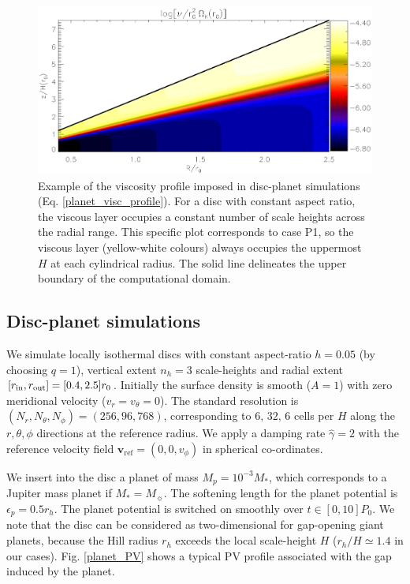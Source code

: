 \begin{figure}
  \centering
  \includegraphics[width=\linewidth]{figures/pdisk_visc2d_planet}
  \caption{Example of the viscosity profile
    imposed in disc-planet simulations
    (Eq. \ref{planet_visc_profile}).  
    For a disc with constant aspect ratio, the viscous
    layer occupies a constant number of scale heights across the
    radial range. This specific plot corresponds to case P1, so the
    viscous layer (yellow-white colours) always occupies the uppermost
    $H$ at each cylindrical radius. 
    The solid line delineates the upper boundary of the computational
    domain. 
    \label{planet_visc2d}}
\end{figure}

\subsection{Disc-planet simulations} 
We simulate locally isothermal discs with constant aspect-ratio
$h=0.05$ (by choosing $q=1$), vertical extent $n_h=3$ scale-heights 
and radial extent $[r_\mathrm{in},r_\mathrm{out}]=[0.4,2.5]r_0$. Initially the surface density is smooth
($A=1$) with zero meridional velocity ($v_r=v_\theta=0$). 
The standard resolution is $(N_r, N_\theta,
N_\phi)=(256, 96, 768)$, corresponding to $6,\,32,\,6$ 
cells per $H$ along the $r,\theta,\phi$ directions at the reference
radius. We apply a damping rate $\hat{\gamma}=2$ with the reference
velocity field $\bm{v}_\mathrm{ref}=(0,0,v_\phi)$ in spherical
co-ordinates.   

We insert into the disc a planet of mass  
$M_p=10^{-3}M_*$, which corresponds to a Jupiter mass planet if
$M_*=M_{\sun}$. The softening length for the planet potential is
$\epsilon_p=0.5r_h$. The planet potential is switched on 
smoothly over $t\in[0,10]P_0$. We note that the disc can be considered
as two-dimensional for gap-opening giant planets, because the Hill
radius $r_h$ exceeds the local scale-height $H$ ($r_h/H\simeq1.4$
in our cases).   Fig. \ref{planet_PV} shows a typical PV profile
  associated with the gap induced by the planet. 


